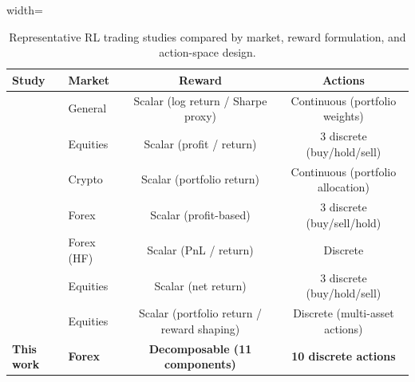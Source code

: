 \begin{table}[!tbp]
\centering
\caption{Representative RL trading studies compared by market, reward formulation, and action-space design.}
\label{tab:related_work_comparison}
\begin{adjustbox}{width=\linewidth}
\begin{tabular}{@{}llcc@{}}
\toprule
\textbf{Study} & \textbf{Market} & \textbf{Reward} & \textbf{Actions} \\
\midrule
\citet{moody2001learning}        
& General    
& Scalar (log return / Sharpe proxy) 
& Continuous (portfolio weights) \\

\citet{deng2016deep}             
& Equities   
& Scalar (profit / return) 
& 3 discrete (buy/hold/sell) \\

\citet{jiang2017deep}            
& Crypto     
& Scalar (portfolio return) 
& Continuous (portfolio allocation) \\

\citet{carapuco2018reinforcement}
& Forex      
& Scalar (profit-based) 
& 3 discrete (buy/sell/hold) \\

\citet{rundo2019deep}            
& Forex (HF) 
& Scalar (PnL / return) 
& Discrete \\

\citet{theate2021application}    
& Equities   
& Scalar (net return) 
& 3 discrete (buy/hold/sell) \\

\citet{liu2021finrl}             
& Equities   
& Scalar (portfolio return / reward shaping) 
& Discrete (multi-asset actions) \\

\textbf{This work}               
& \textbf{Forex} 
& \textbf{Decomposable (11 components)} 
& \textbf{10 discrete actions} \\
\bottomrule
\end{tabular}
\end{adjustbox}
\end{table}